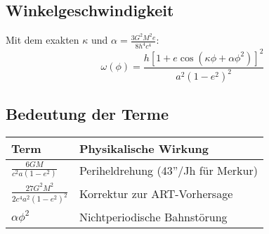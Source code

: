 \subsection{Winkelgeschwindigkeit}
Mit dem exakten \(\kappa\) und \(\alpha = \frac{3G^2M^2e}{8h^4c^4}\):
\begin{equation}
\boxed
{
    \omega(\phi) = \frac{h[1 + e\cos(\kappa\phi + \alpha\phi^2)]^2}{a^2(1-e^2)^2}
}
\end{equation}

\subsection{Bedeutung der Terme}
\begin{tabular}{|l|l|}
\hline
Term & Physikalische Wirkung \\ \hline
\(\frac{6GM}{c^2a(1-e^2)}\) & Periheldrehung (43''/Jh für Merkur) \\ \hline
\(\frac{27G^2M^2}{2c^4a^2(1-e^2)^2}\) & Korrektur zur ART-Vorhersage \\ \hline
\(\alpha\phi^2\) & Nichtperiodische Bahnstörung \\ \hline
\end{tabular}
